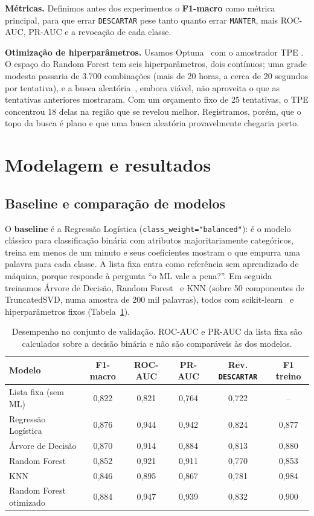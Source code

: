 \documentclass[12pt]{article}
\begin{document}
\textbf{Métricas.} Definimos antes dos experimentos o \textbf{F1-macro} como métrica principal, para que
errar \texttt{DESCARTAR} pese tanto quanto errar \texttt{MANTER}, mais ROC-AUC, PR-AUC e a revocação
de cada classe.

\textbf{Otimização de hiperparâmetros.} Usamos Optuna~\cite{akiba:19} com o amostrador TPE
\cite{bergstra:11}. O espaço do Random Forest tem seis hiperparâmetros, dois contínuos; uma grade
modesta passaria de 3.700 combinações (mais de 20 horas, a cerca de 20 segundos por tentativa), e a
busca aleatória~\cite{bergstra:12}, embora viável, não aproveita o que as tentativas anteriores
mostraram. Com um orçamento fixo de 25 tentativas, o TPE concentrou 18 delas na região que se revelou
melhor. Registramos, porém, que o topo da busca é plano e que uma busca aleatória provavelmente
chegaria perto.

\section{Modelagem e resultados}\label{sec:modelagem}

\subsection{Baseline e comparação de modelos}

O \textbf{baseline} é a Regressão Logística (\texttt{class\_weight="balanced"}): é o modelo clássico
para classificação binária com atributos majoritariamente categóricos, treina em menos de um minuto e
seus coeficientes mostram o que empurra uma palavra para cada classe. A lista fixa entra como
referência sem aprendizado de máquina, porque responde à pergunta ``o ML vale a pena?''. Em seguida
treinamos Árvore de Decisão, Random Forest~\cite{breiman:01} e KNN (sobre 50 componentes de
TruncatedSVD, numa amostra de 200 mil palavras), todos com scikit-learn~\cite{pedregosa:11} e
hiperparâmetros fixos (Tabela~\ref{tab:comparacao}).

\begin{table}[ht]
\centering
\caption{Desempenho no conjunto de validação. ROC-AUC e PR-AUC da lista fixa são calculados sobre a
decisão binária e não são comparáveis às dos modelos.}
\label{tab:comparacao}
\small
\setlength{\tabcolsep}{4pt}
\begin{tabular}{lccccc}
\hline
Modelo & F1-macro & ROC-AUC & PR-AUC & Rev. \texttt{DESCARTAR} & F1 treino \\
\hline
Lista fixa (sem ML)      & 0,822 & 0,821 & 0,764 & 0,722 & --    \\
Regressão Logística      & 0,876 & 0,944 & 0,942 & 0,824 & 0,877 \\
Árvore de Decisão        & 0,870 & 0,914 & 0,884 & 0,813 & 0,880 \\
Random Forest            & 0,852 & 0,921 & 0,911 & 0,770 & 0,853 \\
KNN                      & 0,846 & 0,895 & 0,867 & 0,781 & 0,984 \\
Random Forest otimizado  & 0,884 & 0,947 & 0,939 & 0,832 & 0,900 \\
\hline
\end{tabular}
\end{table}
\end{document}
